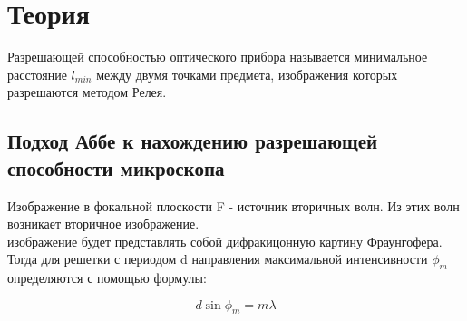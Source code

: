 

\newcommand{\formula}[2]
{
    \begin{equation}\label{#1}
        #2
    \end{equation}
}

\newcommand{\mth}[1]
{
    \begin{math}
        #1
    \end{math}
}

\newcommand{\ruB}[1]
{
    _{\text{#1}}
}

\setcounter{PicsCounter}{1}

\newcommand{\pic}[3]{
    \begin{center}
    \begin{minipage}[h!]{#1}
    \begin{center}

    \texttt{[image: \#2]}
    \textit{Рис \arabic{PicsCounter}. #3}

    \end{center}
    \end{minipage}
    \end{center}

    \stepcounter{PicsCounter}
}

\section{Теория}

Разрешающей способностью оптического прибора называется минимальное расстояние
$ l_{min} $ между двумя точками предмета, изображения которых разрешаются методом Релея.

\subsection{Подход Аббе к нахождению разрешающей способности микроскопа}

Изображение в фокальной плоскости F - источник вторичных волн. Из этих волн возникает
вторичное изображение. \\

 изображение будет представлять собой дифракицонную картину Фраунгофера. Тогда
для решетки с периодом d направления максимальной интенсивности $ \phi_m $ определяются
с помощью формулы:

\formula
{phi-m}
{d \sin\phi_m = m\lambda} \\

